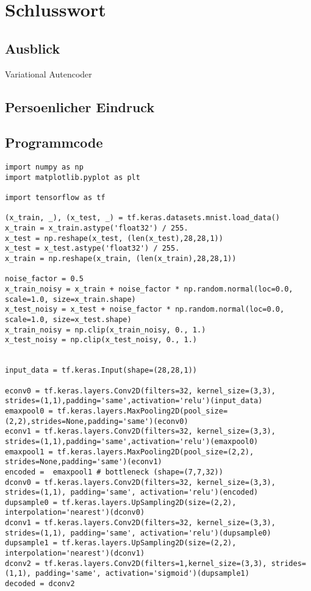 \chapter*{Schlusswort}

\section*{Ausblick}
Variational Autencoder

\section*{Persoenlicher Eindruck}

\begin{appendices}
\chapter{Programmcode}

\begin{verbatim}
import numpy as np
import matplotlib.pyplot as plt

import tensorflow as tf

(x_train, _), (x_test, _) = tf.keras.datasets.mnist.load_data()
x_train = x_train.astype('float32') / 255.
x_test = np.reshape(x_test, (len(x_test),28,28,1))
x_test = x_test.astype('float32') / 255.
x_train = np.reshape(x_train, (len(x_train),28,28,1))

noise_factor = 0.5
x_train_noisy = x_train + noise_factor * np.random.normal(loc=0.0, scale=1.0, size=x_train.shape)
x_test_noisy = x_test + noise_factor * np.random.normal(loc=0.0, scale=1.0, size=x_test.shape)
x_train_noisy = np.clip(x_train_noisy, 0., 1.)
x_test_noisy = np.clip(x_test_noisy, 0., 1.)


input_data = tf.keras.Input(shape=(28,28,1))

econv0 = tf.keras.layers.Conv2D(filters=32, kernel_size=(3,3), strides=(1,1),padding='same',activation='relu')(input_data)
emaxpool0 = tf.keras.layers.MaxPooling2D(pool_size=(2,2),strides=None,padding='same')(econv0)
econv1 = tf.keras.layers.Conv2D(filters=32, kernel_size=(3,3), strides=(1,1),padding='same',activation='relu')(emaxpool0)
emaxpool1 = tf.keras.layers.MaxPooling2D(pool_size=(2,2), strides=None,padding='same')(econv1)
encoded =  emaxpool1 # bottleneck (shape=(7,7,32))
dconv0 = tf.keras.layers.Conv2D(filters=32, kernel_size=(3,3), strides=(1,1), padding='same', activation='relu')(encoded)
dupsample0 = tf.keras.layers.UpSampling2D(size=(2,2), interpolation='nearest')(dconv0)
dconv1 = tf.keras.layers.Conv2D(filters=32, kernel_size=(3,3), strides=(1,1), padding='same', activation='relu')(dupsample0)
dupsample1 = tf.keras.layers.UpSampling2D(size=(2,2), interpolation='nearest')(dconv1)
dconv2 = tf.keras.layers.Conv2D(filters=1,kernel_size=(3,3), strides=(1,1), padding='same', activation='sigmoid')(dupsample1)
decoded = dconv2


\end{verbatim}
\end{appendices}
